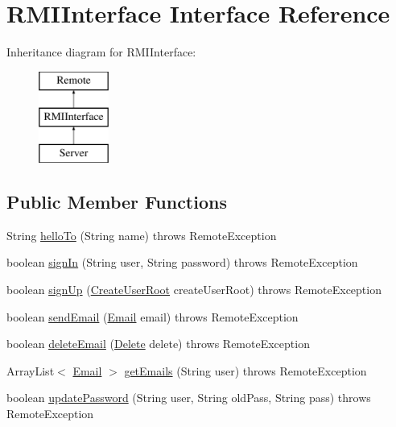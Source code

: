 \hypertarget{interface_r_m_i_interface}{}\section{R\+M\+I\+Interface Interface Reference}
\label{interface_r_m_i_interface}
Inheritance diagram for R\+M\+I\+Interface\+:\begin{figure}[H]
\begin{center}
\leavevmode
\includegraphics[height=3.000000cm]{interface_r_m_i_interface}
\end{center}
\end{figure}
\subsection*{Public Member Functions}
\begin{DoxyCompactItemize}
\item 
String \hyperlink{interface_r_m_i_interface_a44a3680b28462fce581d362dbc6cf1db}{hello\+To} (String name)  throws Remote\+Exception
\item 
boolean \hyperlink{interface_r_m_i_interface_a826db0ba8f0814985cfa911ef76a68cc}{sign\+In} (String user, String password)  throws Remote\+Exception
\item 
boolean \hyperlink{interface_r_m_i_interface_a39fbf15bb1115837ce6025aaa47784bb}{sign\+Up} (\hyperlink{class_create_user_root}{Create\+User\+Root} create\+User\+Root)  throws Remote\+Exception
\item 
boolean \hyperlink{interface_r_m_i_interface_ad86e01382cdb0cb8a64710a7e9102524}{send\+Email} (\hyperlink{class_email}{Email} email)  throws Remote\+Exception
\item 
boolean \hyperlink{interface_r_m_i_interface_a86bc2a5cb0bdb04a1aeb9b36e373cd5e}{delete\+Email} (\hyperlink{class_delete}{Delete} delete)  throws Remote\+Exception
\item 
Array\+List$<$ \hyperlink{class_email}{Email} $>$ \hyperlink{interface_r_m_i_interface_ad326010c8c132dd3398a4443cf827601}{get\+Emails} (String user)  throws Remote\+Exception
\item 
boolean \hyperlink{interface_r_m_i_interface_a643b5963469fbc121032c7d75c01c7b9}{update\+Password} (String user, String old\+Pass, String pass)  throws Remote\+Exception
\end{DoxyCompactItemize}



